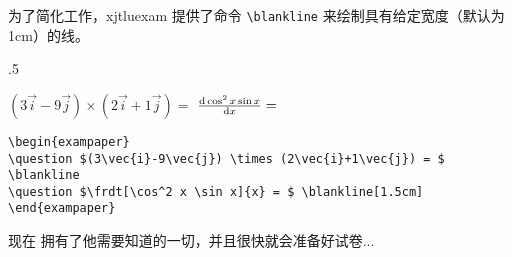 为了简化工作，xjtluexam 提供了命令 \verb=\blankline= 来绘制具有给定宽度（默认为 1cm）的线。
\begin{miniexammar}{.5\textandmarginlen}{
\begin{exampaper}
\question $(3\vec{i}-9\vec{j}) \times (2\vec{i}+1\vec{j}) = $ \blankline
\question $\frdt[\cos^2 x \sin x]{x} = $ \blankline[1.5cm]
\end{exampaper}
}
\begin{lstlisting}
\begin{exampaper}
\question $(3\vec{i}-9\vec{j}) \times (2\vec{i}+1\vec{j}) = $ \blankline
\question $\frdt[\cos^2 x \sin x]{x} = $ \blankline[1.5cm]
\end{exampaper}
\end{lstlisting}
\end{miniexammar}

现在 \raul{} 拥有了他需要知道的一切，并且很快就会准备好试卷...
